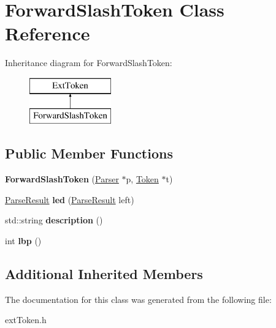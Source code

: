 \hypertarget{class_forward_slash_token}{}\section{Forward\+Slash\+Token Class Reference}
\label{class_forward_slash_token}
Inheritance diagram for Forward\+Slash\+Token\+:\begin{figure}[H]
\begin{center}
\leavevmode
\includegraphics[height=2.000000cm]{class_forward_slash_token}
\end{center}
\end{figure}
\subsection*{Public Member Functions}
\begin{DoxyCompactItemize}
\item 
\hypertarget{class_forward_slash_token_ae818840269cd15f6f6b00929fb4eb979}{}{\bfseries Forward\+Slash\+Token} (\hyperlink{class_parser}{Parser} $\ast$p, \hyperlink{class_token}{Token} $\ast$t)\label{class_forward_slash_token_ae818840269cd15f6f6b00929fb4eb979}

\item 
\hypertarget{class_forward_slash_token_ac2dda7b791ab555e4323f17baaf323e1}{}\hyperlink{class_parse_result}{Parse\+Result} {\bfseries led} (\hyperlink{class_parse_result}{Parse\+Result} left)\label{class_forward_slash_token_ac2dda7b791ab555e4323f17baaf323e1}

\item 
\hypertarget{class_forward_slash_token_ac27b1ab175ec08c468bd0d4c41636a5c}{}std\+::string {\bfseries description} ()\label{class_forward_slash_token_ac27b1ab175ec08c468bd0d4c41636a5c}

\item 
\hypertarget{class_forward_slash_token_ad65829044355922a291dfbfd3052b183}{}int {\bfseries lbp} ()\label{class_forward_slash_token_ad65829044355922a291dfbfd3052b183}

\end{DoxyCompactItemize}
\subsection*{Additional Inherited Members}


The documentation for this class was generated from the following file\+:\begin{DoxyCompactItemize}
\item 
ext\+Token.\+h\end{DoxyCompactItemize}
